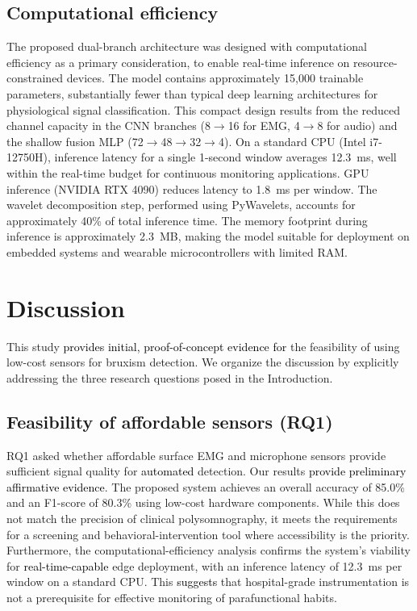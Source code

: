 \documentclass[pdflatex,sn-nature,iicol]{sn-jnl}
\newcommand{\rev}[1]{\textcolor{black}{#1}}
\begin{document}
\subsection{Computational efficiency}

The proposed dual-branch architecture was designed with computational efficiency as a primary consideration, to enable real-time inference on resource-constrained devices. The model contains approximately 15,000 trainable parameters, substantially fewer than typical deep learning architectures for physiological signal classification. This compact design results from the reduced channel capacity in the CNN branches (8$\rightarrow$16 for EMG, 4$\rightarrow$8 for audio) and the shallow fusion MLP (72$\rightarrow$48$\rightarrow$32$\rightarrow$4). On a standard CPU (Intel i7-12750H), inference latency for a single 1-second window averages 12.3~ms, well within the real-time budget for continuous monitoring applications. GPU inference (NVIDIA RTX 4090) reduces latency to 1.8~ms per window. The wavelet decomposition step, performed using PyWavelets, accounts for approximately 40\% of total inference time. The memory footprint during inference is approximately 2.3~MB, making the model suitable for deployment on embedded systems and wearable microcontrollers with limited RAM.


\section{Discussion}

This study \rev{provides initial, proof-of-concept evidence for} the feasibility of using low-cost sensors for bruxism detection. We organize the discussion by explicitly addressing the three research questions posed in the Introduction.

\subsection{Feasibility of affordable sensors (RQ1)}
RQ1 asked whether affordable surface EMG and microphone sensors provide sufficient signal quality for \rev{automated} detection. Our results \rev{provide preliminary affirmative evidence}. The proposed system achieves an overall accuracy of 85.0\% and an F1-score of 80.3\% using low-cost hardware components. While this does not match the precision of clinical polysomnography, it meets the requirements for a screening and behavioral-intervention tool where accessibility is the priority. Furthermore, the computational-efficiency analysis confirms the system's viability for \rev{real-time-capable} edge deployment, with an inference latency of 12.3~ms per window on a standard CPU. This \rev{suggests} that hospital-grade instrumentation is not a prerequisite for effective monitoring of parafunctional habits.
\end{document}
